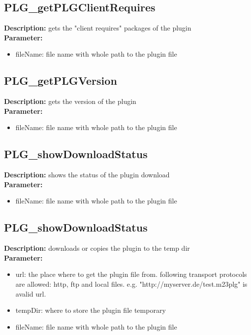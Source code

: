 \subsection{PLG\_getPLGClientRequires}
\textbf{Description:} gets the "client requires" packages of the plugin\\
\textbf{Parameter:}
\begin{itemize}
\item fileName: file name with whole path to the plugin file
\end{itemize}

\subsection{PLG\_getPLGVersion}
\textbf{Description:} gets the version of the plugin\\
\textbf{Parameter:}
\begin{itemize}
\item fileName: file name with whole path to the plugin file
\end{itemize}

\subsection{PLG\_showDownloadStatus}
\textbf{Description:} shows the status of the plugin download\\
\textbf{Parameter:}
\begin{itemize}
\item fileName: file name with whole path to the plugin file
\end{itemize}

\subsection{PLG\_showDownloadStatus}
\textbf{Description:} downloads or copies the plugin to the temp dir\\
\textbf{Parameter:}
\begin{itemize}
\item url: the place where to get the plugin file from. following transport protocols are allowed: http, ftp and local files. e.g. "http://myserver.de/test.m23plg" is avalid url.
\item tempDir: where to store the plugin file temporary
\item fileName: file name with whole path to the plugin file
\end{itemize}

